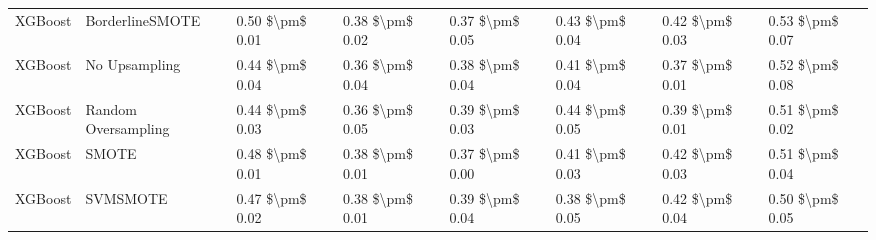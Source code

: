 \begin{tabular}{llllllll}
                        XGBoost &               BorderlineSMOTE & 0.50 \$\textbackslash pm\$ 0.01 &           0.38 \$\textbackslash pm\$ 0.02 &       0.37 \$\textbackslash pm\$ 0.05 &        0.43 \$\textbackslash pm\$ 0.04 &                         0.42 \$\textbackslash pm\$ 0.03 &     0.53 \$\textbackslash pm\$ 0.07 \\
                        XGBoost &                 No Upsampling & 0.44 \$\textbackslash pm\$ 0.04 &           0.36 \$\textbackslash pm\$ 0.04 &       0.38 \$\textbackslash pm\$ 0.04 &        0.41 \$\textbackslash pm\$ 0.04 &                         0.37 \$\textbackslash pm\$ 0.01 &     0.52 \$\textbackslash pm\$ 0.08 \\
                        XGBoost &           Random Oversampling & 0.44 \$\textbackslash pm\$ 0.03 &           0.36 \$\textbackslash pm\$ 0.05 &       0.39 \$\textbackslash pm\$ 0.03 &        0.44 \$\textbackslash pm\$ 0.05 &                         0.39 \$\textbackslash pm\$ 0.01 &     0.51 \$\textbackslash pm\$ 0.02 \\
                        XGBoost &                         SMOTE & 0.48 \$\textbackslash pm\$ 0.01 &           0.38 \$\textbackslash pm\$ 0.01 &       0.37 \$\textbackslash pm\$ 0.00 &        0.41 \$\textbackslash pm\$ 0.03 &                         0.42 \$\textbackslash pm\$ 0.03 &     0.51 \$\textbackslash pm\$ 0.04 \\
                        XGBoost &                      SVMSMOTE & 0.47 \$\textbackslash pm\$ 0.02 &           0.38 \$\textbackslash pm\$ 0.01 &       0.39 \$\textbackslash pm\$ 0.04 &        0.38 \$\textbackslash pm\$ 0.05 &                         0.42 \$\textbackslash pm\$ 0.04 &     0.50 \$\textbackslash pm\$ 0.05 \\
\bottomrule
\end{tabular}
